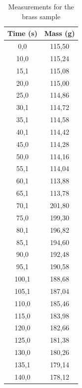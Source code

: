 \documentclass[a4paper, 12pt]{article}
\begin{document}
\newpage
\begin{table}[hbt!]
	\centering
	\caption{Measurements for the brass sample}
	\begin{tabular}{|c | c|}
		\hline
		\textbf{Time (s)} & \textbf{Mass (g)} \\ 
		\hline
		0,0               & 115,50            \\
		10,0              & 115,24            \\
		15,1              & 115,08            \\
		20,0              & 115,00            \\
		25,0              & 114,86            \\
		30,1              & 114,72            \\
		35,1              & 114,58            \\
		40,1              & 114,42            \\
		45,0              & 114,28            \\
		50,0              & 114,16            \\
		55,1              & 114,04            \\
		60,1              & 113,88            \\
		65,1              & 113,78            \\
		\rowcolor[HTML]{FFFF00} 
		70,1              & 201,80            \\
		75,0              & 199,30            \\
		80,1              & 196,82            \\
		85,1              & 194,60            \\
		90,0              & 192,48            \\
		95,1              & 190,58            \\
		100,1             & 188,68            \\
		105,1             & 187,04            \\
		110,0             & 185,46            \\
		115,0             & 183,98            \\
		120,0             & 182,66            \\
		125,0             & 181,38            \\
		130,0             & 180,26            \\
		135,1             & 179,14            \\
		140,0             & 178,12            \\

\end{tabular}
\end{table}
\end{document}
